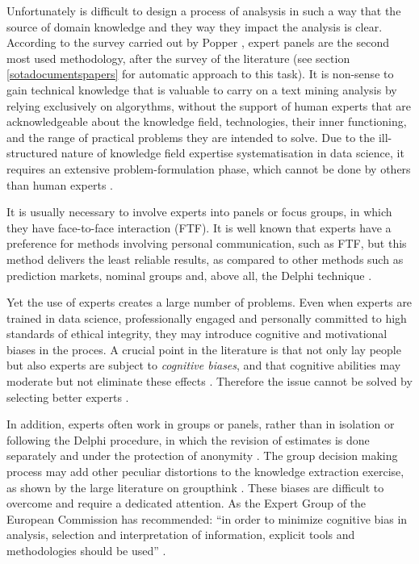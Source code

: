 \documentclass[]{book}
\begin{document}
Unfortunately is difficult to design a process of analsysis in such a
way that the source of domain knowledge and they way they impact the
analysis is clear. According to the survey carried out by Popper
\citep{popper2008foresight}, expert panels are the second most used
methodology, after the survey of the literature (see section
\ref{sotadocumentspapers} for automatic approach to this task). It is
non-sense to gain technical knowledge that is valuable to carry on a
text mining analysis by relying exclusively on algorythms, without the
support of human experts that are acknowledgeable about the knowledge
field, technologies, their inner functioning, and the range of practical
problems they are intended to solve. Due to the ill-structured nature of
knowledge field expertise systematisation in data science, it requires
an extensive problem-formulation phase, which cannot be done by others
than human experts \citep{bracken2013making}.

It is usually necessary to involve experts into panels or focus groups,
in which they have face-to-face interaction (FTF). It is well known that
experts have a preference for methods involving personal communication,
such as FTF, but this method delivers the least reliable results, as
compared to other methods such as prediction markets, nominal groups
and, above all, the Delphi technique
\citep{woudenberg1991evaluation, graefe2011comparing}.

Yet the use of experts creates a large number of problems. Even when
experts are trained in data science, professionally engaged and
personally committed to high standards of ethical integrity, they may
introduce cognitive and motivational biases in the
proces\citep{kahneman2011thinking}. A crucial point in the literature is
that not only lay people but also experts are subject to \emph{cognitive
biases}, and that cognitive abilities may moderate but not eliminate
these effects \citep{stanovich2008relative}. Therefore the issue cannot
be solved by selecting better experts \citep{taleb2007black}.

In addition, experts often work in groups or panels, rather than in
isolation or following the Delphi procedure, in which the revision of
estimates is done separately and under the protection of anonymity
\citep{meijering2016effect, makkonen2016policy}. The group decision
making process may add other peculiar distortions to the knowledge
extraction exercise, as shown by the large literature on groupthink
\citep{janis1972victims, esser1998alive}. These biases are difficult to
overcome and require a dedicated attention. As the Expert Group of the
European Commission has recommended: ``in order to minimize cognitive
bias in analysis, selection and interpretation of information, explicit
tools and methodologies should be used'' \citep{tuomi2013next}.
\end{document}
